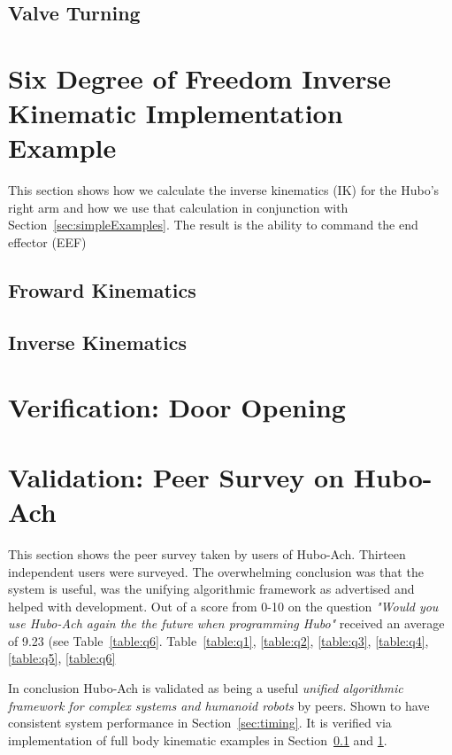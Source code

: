 \subsection{Valve Turning}\label{sec:valve}
	



\section{Six Degree of Freedom Inverse Kinematic Implementation Example}\label{sec:6dofik}
This section shows how we calculate the inverse kinematics (IK) for the Hubo's right arm and how we use that calculation in conjunction with Section~\ref{sec:simpleExamples}.  The result is the ability to command the end effector (EEF)


	\subsection{Froward Kinematics} 
		
	\subsection{Inverse Kinematics}\label{sec:ik}
			

\section{Verification: Door Opening}\label{sec:hubo-achVerification}
	

\section{Validation: Peer Survey on Hubo-Ach}\label{sec:hubo-achSurvey}
	This section shows the peer survey taken by users of Hubo-Ach.
	Thirteen independent users were surveyed.
	The overwhelming conclusion was that the system is useful, was the unifying algorithmic framework as advertised and helped with development.
	Out of a score from 0-10 on the question \textit{"Would you use Hubo-Ach again the the future when programming Hubo"} received an average of 9.23 (see Table~\ref{table:q6}.
	Table~\ref{table:q1}, \ref{table:q2}, \ref{table:q3}, \ref{table:q4}, \ref{table:q5}, \ref{table:q6}

	
	
	
	
	
	

In conclusion Hubo-Ach is validated as being a useful \textit{unified algorithmic framework for complex systems and humanoid robots} by peers.
Shown to have consistent system performance in Section~\ref{sec:timing}.
It is verified via implementation of full body kinematic examples in Section~\ref{sec:valve} and \ref{sec:6dofik}.








